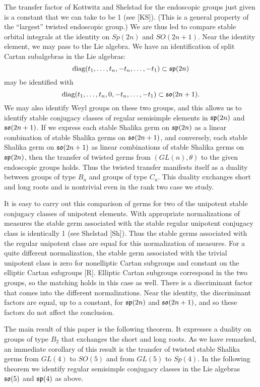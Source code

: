 The transfer factor of Kottwitz and Shelstad for the endoscopic groups
just given is a constant that we can take to be 1 (see [KS]). 
(This is a general property of the ``largest'' twisted
endoscopic group.)
We are thus led
to compare stable orbital integrals at the identity on $Sp(2n)$ and
$SO(2n+1)$.  Near the identity element, we may pass to the Lie
algebra.  We have an identification of split Cartan subalgebras
in the Lie algebras:
$$\diag(t_1,\ldots, t_n,-t_n,\ldots,-t_1)\subset \sp(2n)$$
may be identified with 
$$\diag(t_1,\ldots, t_n,0,-t_n,\ldots,-t_1)\subset \so(2n+1).$$
We may also identify Weyl groups on these two groups, and this allows
us to identify stable conjugacy classes of regular semisimple elements
in $\sp(2n)$ and $\so(2n+1)$.
If we express each stable Shalika germ on $\sp(2n)$ as a linear
combination of stable Shalika germs on $\so(2n+1)$, and conversely,
each stable Shalika germ on $\so(2n+1)$ as linear combinations of
stable Shalika germs on $\sp(2n)$, then the transfer of twisted
germs
from $(GL(n),\theta)$ to the given endoscopic groups holds.
Thus the twisted transfer manifests itself as a duality between
groups of type $B_n$ and groups of type $C_n$.  This
duality exchanges short and long roots and is 
nontrivial even in the rank two case we study.

It is easy to carry out this comparison of germs
for two of the unipotent
stable conjugacy classes of unipotent elements.  With appropriate
normalizations of measures the stable germ associated with the stable
regular unipotent conjugacy class is identically 1  (see Shelstad [Sh]).
Thus the stable germs associated with the regular unipotent class
are equal for this normalization of measures.  For a quite
different normalization, the stable germ associated with 
the trivial unipotent class is zero for nonelliptic Cartan subgroups
and constant on the elliptic Cartan subgroups [R]. Elliptic Cartan subgroups
correspond in the two groups, so the matching holds in this case as
well.  There is a discriminant factor that comes into the different
normalizations.  Near the identity, 
the discriminant factors are
equal, up to a constant, for $\sp(2n)$ and $\so(2n+1)$, and so these
factors do
not affect the conclusion.

The main result of this paper is the following theorem.  It expresses
a duality on groups of type $B_2$ that exchanges the short
and long roots.  As we have remarked, an immediate corollary of this
result is the transfer of twisted stable Shalika germs from $GL(4)$
to $SO(5)$ and from $GL(5)$ to $Sp(4)$.  In the following theorem
we identify regular semisimple conjugacy classes
in the Lie algebras $\so(5)$ and $\sp(4)$
as above.

